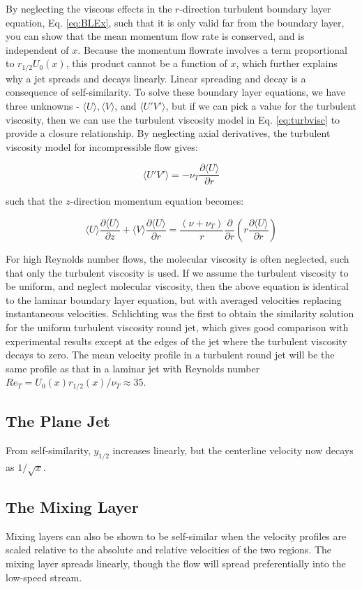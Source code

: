 \documentclass[10pt]{article}
\newcommand{\beq}{\begin{equation}}
\newcommand{\eeq}{\end{equation}}
\newcommand{\la}{\langle}
\newcommand{\ra}{\rangle}
\begin{document}
\begin{flushleft}
By neglecting the viscous effects in the \(r\)-direction turbulent boundary layer equation, Eq. \eqref{eq:BLEx}, such that it is only valid far from the boundary layer, you can show that the mean momentum flow rate is conserved, and is independent of \(x\). Because the momentum flowrate involves a term proportional to \(r_{1/2}U_0(x)\), this product cannot be a function of \(x\), which further explains why a jet spreads and decays linearly. Linear spreading and decay is a consequence of self-similarity. To solve these boundary layer equations, we have three unknowns - \(\la U\ra, \la V\ra\), and \(\la U'V'\ra\), but if we can pick a value for the turbulent viscosity, then we can use the turbulent viscosity model in Eq. \eqref{eq:turbvisc} to provide a closure relationship. By neglecting axial derivatives, the turbulent viscosity model for incompressible flow gives:

\beq
\la U'V'\ra=-\nu_T\frac{\partial\la U\ra}{\partial r}
\eeq

such that the \(z\)-direction momentum equation becomes:

\beq
\la U\ra\frac{\partial \la U\ra}{\partial z}+\la V\ra\frac{\partial \la U\ra}{\partial r}=\frac{(\nu+\nu_T)}{r}\frac{\partial}{\partial r}\left(r\frac{\partial\la U\ra}{\partial r}\right)
\eeq

For high Reynolds number flows, the molecular viscosity is often neglected, such that only the turbulent viscosity is used. If we assume the turbulent viscosity to be uniform, and neglect molecular viscosity, then the above equation is identical to the laminar boundary layer equation, but with averaged velocities replacing instantaneous velocities. Schlichting was the first to obtain the similarity solution for the uniform turbulent viscosity round jet, which gives good comparison with experimental results except at the edges of the jet where the turbulent viscosity decays to zero. The mean velocity profile in a turbulent round jet will be the same profile as that in a laminar jet with Reynolds number \(Re_T=U_0(x)r_{1/2}(x)/\nu_T\approx35\).  



\subsection{The Plane Jet}
From self-similarity, \(y_{1/2}\) increases linearly, but the centerline velocity now decays as \(1/\sqrt{x}\). 

\subsection{The Mixing Layer}
Mixing layers can also be shown to be self-similar when the velocity profiles are scaled relative to the absolute and relative velocities of the two regions. The mixing layer spreads linearly, though the flow will spread preferentially into the low-speed stream. 


\end{flushleft}
\end{document}
